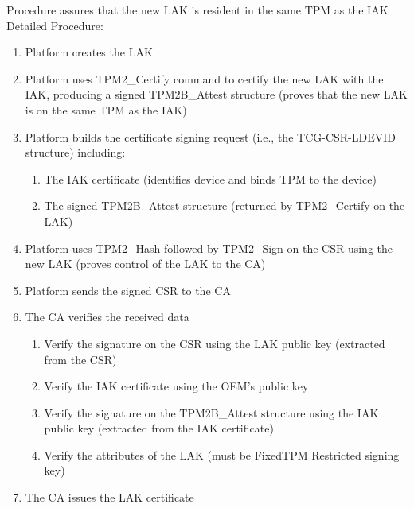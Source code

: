 \documentclass{article}
\begin{document}
Procedure assures that the new LAK is resident in the same TPM as the IAK \\

Detailed Procedure:
\begin{enumerate}
    \item Platform creates the LAK
    \item Platform uses TPM2\_Certify command to certify the new LAK with the IAK, producing a signed TPM2B\_Attest structure (proves that the new LAK is on the same TPM as the IAK)
    \item Platform builds the certificate signing request (i.e., the TCG-CSR-LDEVID structure) including:
    \begin{enumerate}
        \item The IAK certificate (identifies device and binds TPM to the device)
        \item The signed TPM2B\_Attest structure (returned by TPM2\_Certify on the LAK)
    \end{enumerate}
    \item Platform uses TPM2\_Hash followed by TPM2\_Sign on the CSR using the new LAK (proves control of the LAK to the CA)
    \item Platform sends the signed CSR to the CA
    \item The CA verifies the received data
    \begin{enumerate}
        \item Verify the signature on the CSR using the LAK public key (extracted from the CSR)
        \item Verify the IAK certificate using the OEM's public key
        \item Verify the signature on the TPM2B\_Attest structure using the IAK public key (extracted from the IAK certificate)
        \item Verify the attributes of the LAK (must be FixedTPM Restricted signing key)
    \end{enumerate}
    \item The CA issues the LAK certificate
\end{enumerate}
\end{document}
